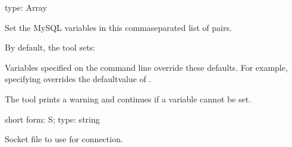 \documentclass[letterpaper,10pt,english]{sphinxmanual}
\begin{document}

\begin{fulllineitems}
\label{\detokenize{mariadb-config-diff:cmdoption-mariadb-config-diff-set-vars}}
\sphinxAtStartPar
type: Array

\sphinxAtStartPar
Set the MySQL variables in this comma\sphinxhyphen{}separated list of  pairs.

\sphinxAtStartPar
By default, the tool sets:

\begin{sphinxVerbatim}[commandchars=\\\{\}]
\end{sphinxVerbatim}

\sphinxAtStartPar
Variables specified on the command line override these defaults.  For
example, specifying  overrides the defaultvalue of .

\sphinxAtStartPar
The tool prints a warning and continues if a variable cannot be set.

\end{fulllineitems}


\begin{fulllineitems}
\label{\detokenize{mariadb-config-diff:cmdoption-mariadb-config-diff-socket}}
\sphinxAtStartPar
short form: \sphinxhyphen{}S; type: string

\sphinxAtStartPar
Socket file to use for connection.

\end{fulllineitems}
\end{document}
